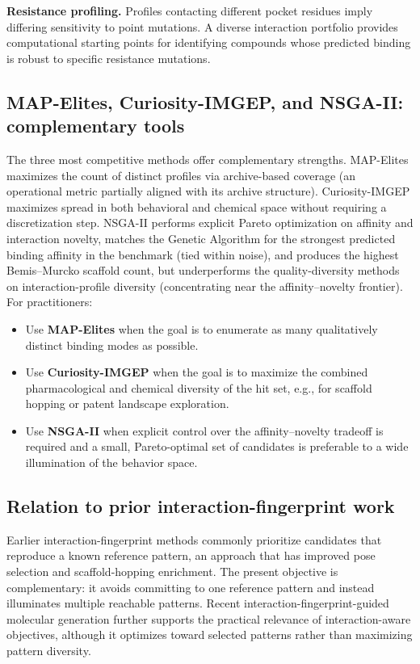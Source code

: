 \documentclass[journal=jcisd8,manuscript=article]{achemso}
\begin{document}
\textbf{Resistance profiling.} Profiles contacting different pocket residues imply differing sensitivity to point mutations. A diverse interaction portfolio provides computational starting points for identifying compounds whose predicted binding is robust to specific resistance mutations.

\subsection{MAP-Elites, Curiosity-IMGEP, and NSGA-II: complementary tools}

The three most competitive methods offer complementary strengths. MAP-Elites maximizes the count of distinct profiles via archive-based coverage (an operational metric partially aligned with its archive structure). Curiosity-IMGEP maximizes spread in both behavioral and chemical space without requiring a discretization step. NSGA-II performs explicit Pareto optimization on affinity and interaction novelty, matches the Genetic Algorithm for the strongest predicted binding affinity in the benchmark (tied within noise), and produces the highest Bemis--Murcko scaffold count, but underperforms the quality-diversity methods on interaction-profile diversity (concentrating near the affinity--novelty frontier). For practitioners:
\begin{itemize}
    \item Use \textbf{MAP-Elites} when the goal is to enumerate as many qualitatively distinct binding modes as possible.
    \item Use \textbf{Curiosity-IMGEP} when the goal is to maximize the combined pharmacological and chemical diversity of the hit set, e.g., for scaffold hopping or patent landscape exploration.
    \item Use \textbf{NSGA-II} when explicit control over the affinity--novelty tradeoff is required and a small, Pareto-optimal set of candidates is preferable to a wide illumination of the behavior space.
\end{itemize}

\subsection{Relation to prior interaction-fingerprint work}

Earlier interaction-fingerprint methods commonly prioritize candidates that reproduce a known reference pattern, an approach that has improved pose selection and scaffold-hopping enrichment.\cite{marcou2007mifp,da2014splif,venhorst2008scaffold,jasper2018padif} The present objective is complementary: it avoids committing to one reference pattern and instead illuminates multiple reachable patterns. Recent interaction-fingerprint-guided molecular generation further supports the practical relevance of interaction-aware objectives, although it optimizes toward selected patterns rather than maximizing pattern diversity.\cite{wang2026ifpgen}
\end{document}
